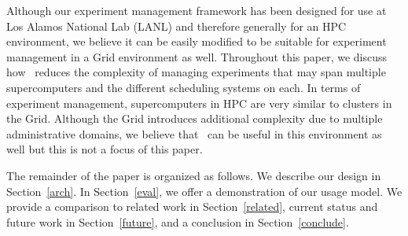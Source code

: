 Although our experiment management framework has been designed for use at Los
Alamos National Lab (LANL) and therefore generally for an HPC environment, we
believe it can be easily modified to be suitable for experiment management in a
Grid environment as well.  Throughout this paper, we discuss how \name\ reduces
the complexity of managing experiments that may span multiple supercomputers
and the different scheduling systems on each.  In terms of experiment
management, supercomputers in HPC are very similar to clusters in the Grid.
Although the Grid introduces additional complexity due to multiple
administrative domains, we believe that \name\ can be useful in this
environment as well but this is not a focus of this paper.



The remainder of the paper is organized as follows.  We describe our design in
Section~\ref{arch}.  In Section~\ref{eval}, we offer a demonstration of our
usage model.  We provide a comparison to related work in Section~\ref{related},
current status and future work in Section~\ref{future}, and a conclusion in
Section~\ref{conclude}.
